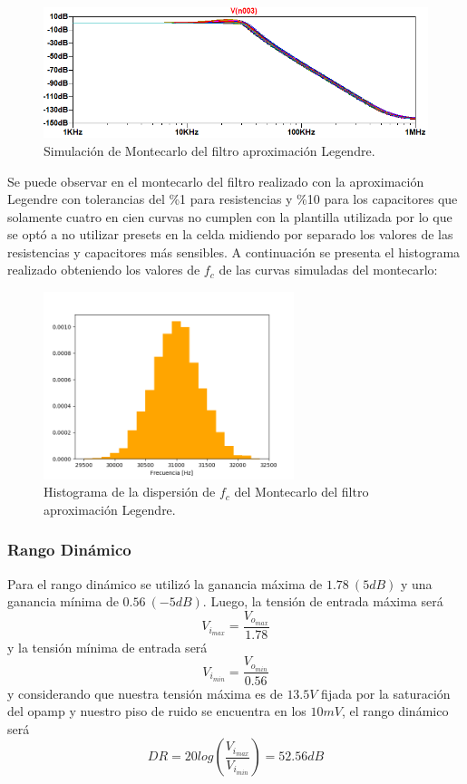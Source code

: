 \begin{figure}[H]
\centering
	\centering
	\includegraphics[width=\textwidth]{Imagenes-Ej1/legendre_mont.png}
	\caption{Simulación de Montecarlo del filtro aproximación Legendre.}
	\label{leg_mont_sim}
\end{figure}

Se puede observar en el montecarlo del filtro realizado con la aproximación Legendre con tolerancias del \%1  para resistencias y \%10 para los capacitores que solamente cuatro en cien curvas no cumplen con la plantilla utilizada por lo que se optó a no utilizar presets en la celda midiendo por separado los valores de las resistencias y capacitores más sensibles. A continuación se presenta el histograma realizado obteniendo los valores de $f_c$ de las curvas simuladas del montecarlo:

\begin{figure}[H]
\centering
	\centering
	\includegraphics[width=0.65\textwidth]{Imagenes-Ej1/histoleg.png}
	\caption{Histograma de la dispersión de $f_c$ del Montecarlo del filtro aproximación Legendre.}
\end{figure}

\subsubsection{Rango Dinámico}

Para el rango dinámico se utilizó la ganancia máxima de $1.78 \ (5dB)$ y una ganancia mínima de $0.56 \ (-5dB)$. Luego, la tensión de entrada máxima será
\begin{equation}
V_{i_{max}}= \frac{V_{o_{max}}}{1.78}
\end{equation}
y la tensión mínima de entrada será
\begin{equation}
V_{i_{min}}= \frac{V_{o_{min}}}{0.56}
\end{equation}
y considerando que nuestra tensión máxima es de $13.5V$ fijada por la saturación del opamp y nuestro piso de ruido se encuentra en los $10mV$, el rango dinámico será
\begin{equation}
DR=20log(\frac{V_{i_{max}}}{V_{i_{min}}}) = 52.56dB
\end{equation}


